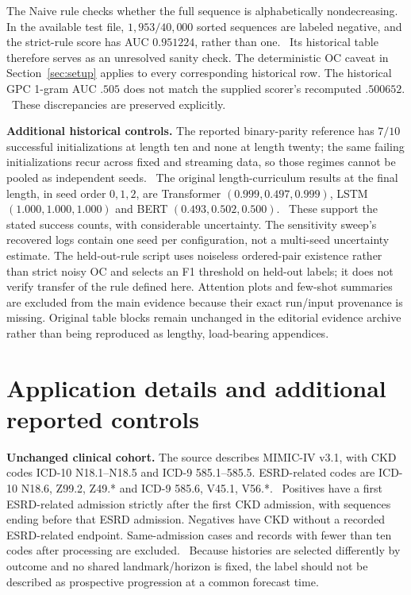 The Naive rule checks whether the full sequence is alphabetically nondecreasing. In the available test file, $1{,}953/40{,}000$ sorted sequences are labeled negative, and the strict-rule score has AUC $0.951224$, rather than one. \newres\ Its historical table therefore serves as an unresolved sanity check. The deterministic OC caveat in Section~\ref{sec:setup} applies to every corresponding historical row. The historical GPC 1-gram AUC $.505$ does not match the supplied scorer's recomputed $.500652$. \ou\recomp\ These discrepancies are preserved explicitly.


\FloatBarrier

\textbf{Additional historical controls.} The reported binary-parity reference has $7/10$ successful initializations at length ten and none at length twenty; the same failing initializations recur across fixed and streaming data, so those regimes cannot be pooled as independent seeds. \ou\ The original length-curriculum results at the final length, in seed order $0,1,2$, are Transformer $(0.999,0.497,0.999)$, LSTM $(1.000,1.000,1.000)$ and BERT $(0.493,0.502,0.500)$. \ou\ These support the stated success counts, with considerable uncertainty. The sensitivity sweep's recovered logs contain one seed per configuration, not a multi-seed uncertainty estimate. The held-out-rule script uses noiseless ordered-pair existence rather than strict noisy OC and selects an F1 threshold on held-out labels; it does not verify transfer of the rule defined here. Attention plots and few-shot summaries are excluded from the main evidence because their exact run/input provenance is missing. Original table blocks remain unchanged in the editorial evidence archive rather than being reproduced as lengthy, load-bearing appendices.

\section{Application details and additional reported controls}
\label{app:clinical}
\textbf{Unchanged clinical cohort.} The source describes MIMIC-IV v3.1, with CKD codes ICD-10 N18.1--N18.5 and ICD-9 585.1--585.5. ESRD-related codes are ICD-10 N18.6, Z99.2, Z49.* and ICD-9 585.6, V45.1, V56.*. \orig\ Positives have a first ESRD-related admission strictly after the first CKD admission, with sequences ending before that ESRD admission. Negatives have CKD without a recorded ESRD-related endpoint. Same-admission cases and records with fewer than ten codes after processing are excluded. \orig\ Because histories are selected differently by outcome and no shared landmark/horizon is fixed, the label should not be described as prospective progression at a common forecast time.

